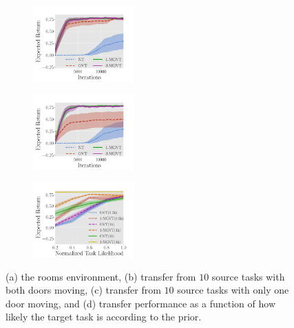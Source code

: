 \documentclass{article}
\begin{document}
\begin{figure}[t]
\begin{subfigure}[b]{0.15\textwidth}
    \caption{}\label{f:rooms}
  \end{subfigure}
  \begin{subfigure}[b]{0.27\textwidth}
    \includegraphics[trim=0cm 0cm 1.8cm 1.3cm,clip=true,height=2.9cm]{images/three-room/lrev.pdf}
    \caption{}\label{f:two_doors}
  \end{subfigure}
    \begin{subfigure}[b]{0.27\textwidth}
    \includegraphics[trim=0cm 0cm 1.6cm 1.3cm,clip=true,height=2.9cm]{images/three-room-gen/lrev.pdf}
    \caption{}\label{f:one_door}
  \end{subfigure}
    \begin{subfigure}[b]{0.27\textwidth}
    \includegraphics[trim=0cm 0cm 1.6cm 1.3cm,clip=true,height=2.9cm]{images/likelihood/lrew.pdf}
    \caption{}\label{f:likelihood}
  \end{subfigure}
  \caption{(a) the rooms environment, (b) transfer from $10$ source tasks with both doors moving, (c) transfer from $10$ source tasks with only one door moving, and (d) transfer performance as a function of how likely the target task is according to the prior.}
  \label{fig:dipfdbsgraphplots}
\end{figure}
\end{document}
